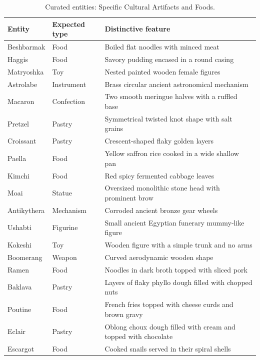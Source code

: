 \begin{table}[p]
\centering
\small
\caption{Curated entities: Specific Cultural Artifacts and Foods.}
\label{tab:curated-artifacts}
\begin{tabular}{@{}p{}p{}p{}@{}}
\toprule
Entity & Expected type & Distinctive feature\tabularnewline
\midrule
\raggedright Beshbarmak & \raggedright Food & \raggedright Boiled flat noodles with minced meat\tabularnewline
\raggedright Haggis & \raggedright Food & \raggedright Savory pudding encased in a round casing\tabularnewline
\raggedright Matryoshka & \raggedright Toy & \raggedright Nested painted wooden female figures\tabularnewline
\raggedright Astrolabe & \raggedright Instrument & \raggedright Brass circular ancient astronomical mechanism\tabularnewline
\raggedright Macaron & \raggedright Confection & \raggedright Two smooth meringue halves with a ruffled base\tabularnewline
\raggedright Pretzel & \raggedright Pastry & \raggedright Symmetrical twisted knot shape with salt grains\tabularnewline
\raggedright Croissant & \raggedright Pastry & \raggedright Crescent-shaped flaky golden layers\tabularnewline
\raggedright Paella & \raggedright Food & \raggedright Yellow saffron rice cooked in a wide shallow pan\tabularnewline
\raggedright Kimchi & \raggedright Food & \raggedright Red spicy fermented cabbage leaves\tabularnewline
\raggedright Moai & \raggedright Statue & \raggedright Oversized monolithic stone head with prominent brow\tabularnewline
\raggedright Antikythera & \raggedright Mechanism & \raggedright Corroded ancient bronze gear wheels\tabularnewline
\raggedright Ushabti & \raggedright Figurine & \raggedright Small ancient Egyptian funerary mummy-like figure\tabularnewline
\raggedright Kokeshi & \raggedright Toy & \raggedright Wooden figure with a simple trunk and no arms\tabularnewline
\raggedright Boomerang & \raggedright Weapon & \raggedright Curved aerodynamic wooden shape\tabularnewline
\raggedright Ramen & \raggedright Food & \raggedright Noodles in dark broth topped with sliced pork\tabularnewline
\raggedright Baklava & \raggedright Pastry & \raggedright Layers of flaky phyllo dough filled with chopped nuts\tabularnewline
\raggedright Poutine & \raggedright Food & \raggedright French fries topped with cheese curds and brown gravy\tabularnewline
\raggedright Eclair & \raggedright Pastry & \raggedright Oblong choux dough filled with cream and topped with chocolate\tabularnewline
\raggedright Escargot & \raggedright Food & \raggedright Cooked snails served in their spiral shells\tabularnewline

\end{tabular}
\end{table}
